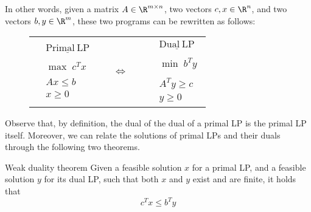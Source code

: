 \documentclass[a4paper, 12pt]{report}
\begin{document}
    In other words, given a matrix $A \in \R^{m \times n}$, two vectors $c, x \in \R^n$, and two vectors $b, y \in \R^m$, these two programs can be rewritten as follows:
     \begin{figure}[H]
        \centering

        \begin{tabular}{ccccc}
            $\begin{array}{cc}
                & \mathrm{\underline{Primal \ LP}} \\\\
                & \max \; c^Tx \\\\
                & Ax \le b \\
                & x \ge 0
            \end{array}
            $

            &\qquad& $\iff$ &\qquad&

            $
            \begin{array}{cc}
                & \mathrm{\underline{Dual \ LP}} \\\\
                & \min \; b^Ty \\\\
                & A^Ty \ge c \\
                & y \ge 0
            \end{array}
            $
        \end{tabular}
    \end{figure}

    Observe that, by definition, the dual of the dual of a primal LP is the primal LP itself. Moreover, we can relate the solutions of primal LPs and their duals through the following two theorems.

    \begin{framedthm}{Weak duality theorem}
        Given a feasible solution $x$ for a primal LP, and a feasible solution $y$ for its dual LP, such that both $x$ and $y$ exist and are finite, it holds that $$c^T x \le b^T y$$
    \end{framedthm}
\end{document}
